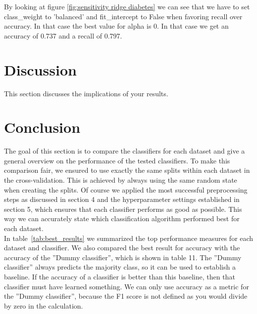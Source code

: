 \documentclass[a4paper,12pt]{article}
\begin{document}
By looking at figure \ref{fig:sensitivity ridge diabetes} we can see that we have to set \textsf{class\_weight} to \textsf{'balanced'} and \textsf{fit\_intercept} to \textsf{False} when favoring recall over accuracy. In that case the best value for alpha is 0. In that case we get an accuracy of 0.737 and a recall of 0.797.%

\section{Discussion}
This section discusses the implications of your results.

\section{Conclusion}
The goal of this section is to compare the classifiers for each dataset and give a general overview on the
performance of the tested classifiers. To make this comparison fair, we ensured to use exactly the same
splits within each dataset in the cross-validation. This is achieved by always using the same random state
when creating the splits. Of course we applied the most successful preprocessing steps as discussed in
section 4 and the hyperparameter settings established in section 5, which ensures that each classifier
performs as good as possible. This way we can accurately state which classification algorithm performed
best for each dataset.\\
In table~\ref{tab:best_results} we summarized the top performance measures for each dataset and classifier. We also compared
the best result for accuracy with the accuracy of the ”Dummy classifier”, which is shown in table 11.
The ”Dummy classifier” always predicts the majority class, so it can be used to establish a baseline. If
the accuracy of a classifier is better than this baseline, then that classifier must have learned something.
We can only use accuracy as a metric for the ”Dummy classifier”, because the F1 score is not defined as
you would divide by zero in the calculation.
\end{document}
